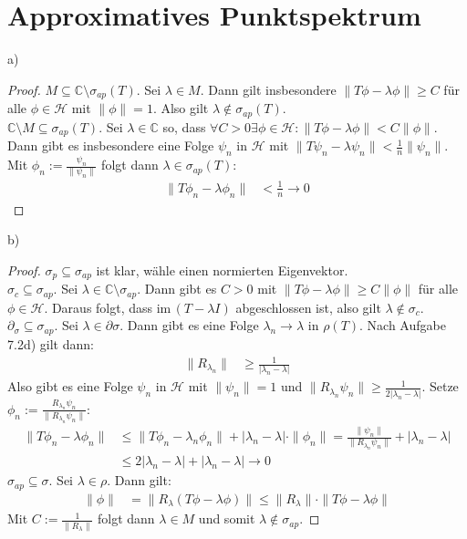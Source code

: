 \documentclass[a4paper,12pt]{article}
\begin{document}
\section{Approximatives Punktspektrum}
a)
\begin{proof}
$M\subseteq\mathbb{C}\setminus\sigma_{ap}(T)$. Sei $\lambda\in M$. Dann gilt insbesondere $\|T\phi-\lambda\phi\|\ge C$ für alle $\phi\in\mathcal{H}$ mit $\|\phi\|=1$. Also gilt $\lambda\notin\sigma_{ap}(T)$. \\
$\mathbb{C}\setminus M\subseteq \sigma_{ap}(T)$. Sei $\lambda\in\mathbb{C}$ so, dass $\forall C>0\exists\phi\in\mathcal{H}:\|T\phi-\lambda\phi\|<C\|\phi\|$. Dann gibt es insbesondere eine Folge $\psi_n$ in $\mathcal{H}$ mit $\|T\psi_n-\lambda\psi_n\|<\frac{1}{n}\|\psi_n\|$. Mit $\phi_n:=\frac{\psi_n}{\|\psi_n\|}$ folgt dann $\lambda\in\sigma_{ap}(T)$:
\begin{align*}
\|T\phi_n-\lambda\phi_n\|&<\frac{1}{n}\rightarrow 0
\end{align*}
\end{proof}
b)
\begin{proof}
$\sigma_p\subseteq\sigma_{ap}$ ist klar, wähle einen normierten Eigenvektor. \\
$\sigma_c\subseteq\sigma_{ap}$. Sei $\lambda\in\mathbb{C}\setminus\sigma_{ap}$. Dann gibt es $C>0$ mit $\|T\phi-\lambda\phi\|\ge C\|\phi\|$ für alle $\phi\in\mathcal{H}$. Daraus folgt, dass im\,$(T-\lambda I)$ abgeschlossen ist, also gilt $\lambda\notin\sigma_c$.\\
$\partial_\sigma\subseteq\sigma_{ap}$. Sei $\lambda\in\partial\sigma$. Dann gibt es eine Folge $\lambda_n\rightarrow\lambda$ in $\rho(T)$. Nach Aufgabe 7.2d) gilt dann:
\begin{align*}
\|R_{\lambda_n}\|&\ge \frac{1}{|\lambda_n-\lambda|}
\end{align*}
Also gibt es eine Folge $\psi_n$ in $\mathcal{H}$ mit $\|\psi_n\|=1$ und $\|R_{\lambda_n}\psi_n\|\ge\frac{1}{2|\lambda_n-\lambda|}$. Setze $\phi_n:=\frac{R_{\lambda_n}\psi_n}{\|R_{\lambda_n}\psi_n\|}$:
\begin{align*}
\|T\phi_n-\lambda\phi_n\|&\le\|T\phi_n-\lambda_n\phi_n\|+|\lambda_n-\lambda|\cdot\|\phi_n\|=\frac{\|\psi_n\|}{\|R_{\lambda_n}\psi_n\|}+|\lambda_n-\lambda|\\
&\le 2|\lambda_n-\lambda|+|\lambda_n-\lambda|\rightarrow 0
\end{align*}
$\sigma_{ap}\subseteq\sigma$. Sei $\lambda\in\rho$. Dann gilt:
\begin{align*}
\|\phi\|&=\|R_\lambda (T\phi-\lambda\phi)\|\le\|R_\lambda\|\cdot\|T\phi-\lambda\phi\|
\end{align*}
Mit $C:=\frac{1}{\|R_\lambda\|}$ folgt dann $\lambda\in M$ und somit $\lambda\notin\sigma_{ap}$. 
\end{proof}
\end{document}
